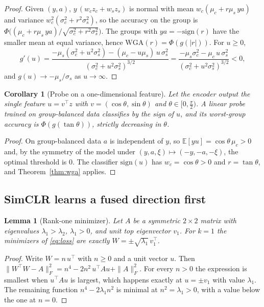 \documentclass[11pt]{article}
\newtheorem{lemma}[theorem]{Lemma}
\newtheorem{corollary}[theorem]{Corollary}
\theoremstyle{definition}
\theoremstyle{remark}
\newcommand{\E}{\mathbb{E}}
\newcommand{\wga}{\mathrm{WGA}}
\begin{document}
\begin{proof}
Given $(y,a)$, $y\,(w_cz_c+w_sz_s)$ is normal with mean $w_c(\mu_c+r\mu_s\,ya)$ and variance
$w_c^2(\sigma_c^2+r^2\sigma_s^2)$, so the accuracy on the group is
$\Phi\big((\mu_c+r\mu_s\,ya)/\sqrt{\sigma_c^2+r^2\sigma_s^2}\big)$. The groups with $ya=-\mathrm{sign}(r)$ have the
smaller mean at equal variance, hence $\wga(r)=\Phi(g(|r|))$. For $u\ge0$,
\[
g'(u)=\frac{-\mu_s(\sigma_c^2+u^2\sigma_s^2)-(\mu_c-u\mu_s)\,u\,\sigma_s^2}{(\sigma_c^2+u^2\sigma_s^2)^{3/2}}
=\frac{-\mu_s\sigma_c^2-\mu_c\,u\,\sigma_s^2}{(\sigma_c^2+u^2\sigma_s^2)^{3/2}}<0,
\]
and $g(u)\to-\mu_s/\sigma_s$ as $u\to\infty$.
\end{proof}

\begin{corollary}[Probe on a one-dimensional feature]\label{cor:probe}
Let the encoder output the single feature $u=v^\top z$ with $v=(\cos\theta,\sin\theta)$ and $\theta\in[0,\tfrac\pi2)$.
A linear probe trained on group-balanced data classifies by the sign of $u$, and its worst-group accuracy is
$\Phi(g(\tan\theta))$, strictly decreasing in $\theta$.
\end{corollary}

\begin{proof}
On group-balanced data $a$ is independent of $y$, so $\E[yu]=\cos\theta\,\mu_c>0$ and, by the symmetry of the model
under $(y,a,\xi)\mapsto(-y,-a,-\xi)$, the optimal threshold is $0$. The classifier $\mathrm{sign}(u)$ has
$w_c=\cos\theta>0$ and $r=\tan\theta$, and Theorem~\ref{thm:wga} applies.
\end{proof}

\subsection{SimCLR learns a fused direction first}

\begin{lemma}[Rank-one minimizer]\label{lem:rank1}
Let $A$ be a symmetric $2\times2$ matrix with eigenvalues $\lambda_1>\lambda_2$, $\lambda_1>0$, and unit top eigenvector
$v_1$. For $k=1$ the minimizers of \eqref{eq:loss} are exactly $W=\pm\sqrt{\lambda_1}\,v_1^\top$.
\end{lemma}

\begin{proof}
Write $W=n\,u^\top$ with $n\ge0$ and a unit vector $u$. Then
$\|W^\top W-A\|_F^2=n^4-2n^2\,u^\top Au+\|A\|_F^2$. For every $n>0$ the expression is smallest when $u^\top Au$ is
largest, which happens exactly at $u=\pm v_1$ with value $\lambda_1$. The remaining function $n^4-2\lambda_1n^2$ is
minimal at $n^2=\lambda_1>0$, with a value below the one at $n=0$.
\end{proof}
\end{document}
